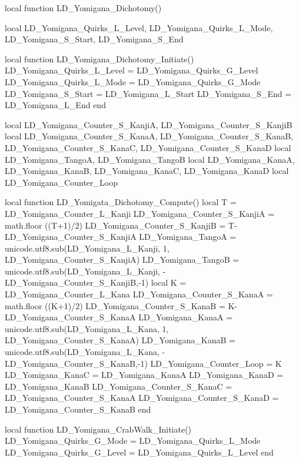 {			
		local function LD_Yomigana_Dichotomy()
		
		
			local LD_Yomigana_Quirks_L_Level, LD_Yomigana_Quirks_L_Mode, LD_Yomigana_S_Start, LD_Yomigana_S_End
		
			local function LD_Yomigana_Dichotomy_Initiate()
				LD_Yomigana_Quirks_L_Level = LD_Yomigana_Quirks_G_Level
				LD_Yomigana_Quirks_L_Mode = LD_Yomigana_Quirks_G_Mode
				LD_Yomigana_S_Start = LD_Yomigana_L_Start
				LD_Yomigana_S_End = LD_Yomigana_L_End
			end

			local LD_Yomigana_Counter_S_KanjiA, LD_Yomigana_Counter_S_KanjiB
			local LD_Yomigana_Counter_S_KanaA, LD_Yomigana_Counter_S_KanaB, LD_Yomigana_Counter_S_KanaC, LD_Yomigana_Counter_S_KanaD
			local LD_Yomigana_TangoA, LD_Yomigana_TangoB %
			local LD_Yomigana_KanaA, LD_Yomigana_KanaB, LD_Yomigana_KanaC, LD_Yomigana_KanaD
			local 	LD_Yomigana_Counter_Loop
		
			local function LD_Yomigata_Dichotomy_Compute()
				local T = LD_Yomigana_Counter_L_Kanji
				LD_Yomigana_Counter_S_KanjiA = math.floor ((T+1)/2)
				LD_Yomigana_Counter_S_KanjiB = T-LD_Yomigana_Counter_S_KanjiA
				LD_Yomigana_TangoA = unicode.utf8.sub(LD_Yomigana_L_Kanji, 1, LD_Yomigana_Counter_S_KanjiA)
				LD_Yomigana_TangoB = unicode.utf8.sub(LD_Yomigana_L_Kanji, -LD_Yomigana_Counter_S_KanjiB,-1)
				local K = LD_Yomigana_Counter_L_Kana
				LD_Yomigana_Counter_S_KanaA = math.floor ((K+1)/2)
				LD_Yomigana_Counter_S_KanaB = K-LD_Yomigana_Counter_S_KanaA
				LD_Yomigana_KanaA = unicode.utf8.sub(LD_Yomigana_L_Kana, 1, LD_Yomigana_Counter_S_KanaA)
				LD_Yomigana_KanaB = unicode.utf8.sub(LD_Yomigana_L_Kana, -LD_Yomigana_Counter_S_KanaB,-1)
				LD_Yomigana_Counter_Loop = K
				LD_Yomigana_KanaC = LD_Yomigana_KanaA
				LD_Yomigana_KanaD = LD_Yomigana_KanaB
				LD_Yomigana_Counter_S_KanaC = LD_Yomigana_Counter_S_KanaA
				LD_Yomigana_Counter_S_KanaD = LD_Yomigana_Counter_S_KanaB
			end			
		
			local function LD_Yomigana_CrabWalk_Initiate()
				LD_Yomigana_Quirks_G_Mode = LD_Yomigana_Quirks_L_Mode
				LD_Yomigana_Quirks_G_Level = LD_Yomigana_Quirks_L_Level				
			end	
		
}
